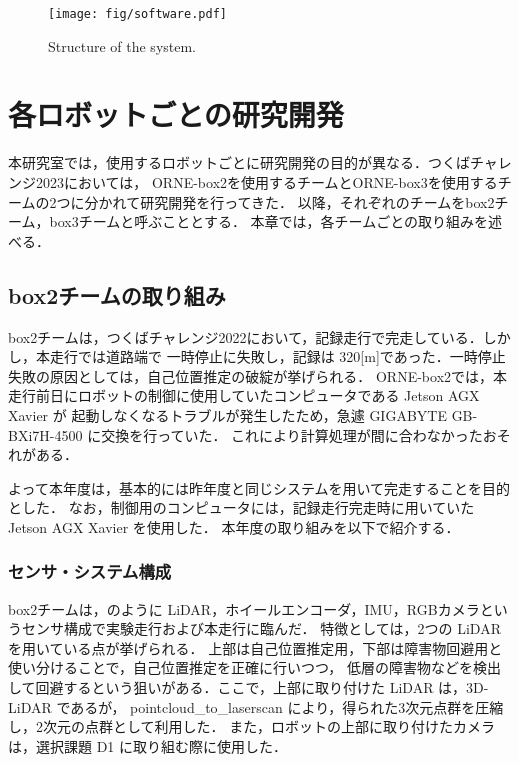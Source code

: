 \documentclass[twocolumn, 9pt]{jsproceedings}
\begin{document}
\begin{figure}[h!]
  \centering
  \texttt{[image: fig/software.pdf]}
  \caption{Structure of the system.}
  \label{fig:soft-fig}
\end{figure}

\vspace*{2mm}

\section{各ロボットごとの研究開発}
本研究室では，使用するロボットごとに研究開発の目的が異なる．つくばチャレンジ2023においては，
ORNE-box2を使用するチームとORNE-box3を使用するチームの2つに分かれて研究開発を行ってきた．
以降，それぞれのチームをbox2チーム，box3チームと呼ぶこととする．
本章では，各チームごとの取り組みを述べる．

\subsection{box2チームの取り組み}
box2チームは，つくばチャレンジ2022において，記録走行で完走している．しかし，本走行では道路端で
一時停止に失敗し，記録は 320[m]であった．一時停止失敗の原因としては，自己位置推定の破綻が挙げられる．
ORNE-box2では，本走行前日にロボットの制御に使用していたコンピュータである Jetson AGX Xavier が
起動しなくなるトラブルが発生したため，急遽 GIGABYTE GB-BXi7H-4500 に交換を行っていた．
これにより計算処理が間に合わなかったおそれがある．

よって本年度は，基本的には昨年度と同じシステムを用いて完走することを目的とした．
なお，制御用のコンピュータには，記録走行完走時に用いていた Jetson AGX Xavier を使用した．
本年度の取り組みを以下で紹介する．

\subsubsection{センサ・システム構成}
box2チームは，のように LiDAR，ホイールエンコーダ，IMU，RGBカメラというセンサ構成で実験走行および本走行に臨んだ．
特徴としては，2つの LiDAR を用いている点が挙げられる．
上部は自己位置推定用，下部は障害物回避用と使い分けることで，自己位置推定を正確に行いつつ，
低層の障害物などを検出して回避するという狙いがある．ここで，上部に取り付けた LiDAR は，3D-LiDAR であるが，
pointcloud\_to\_laserscan\cite{pointcloud} により，得られた3次元点群を圧縮し，2次元の点群として利用した．
また，ロボットの上部に取り付けたカメラは，選択課題 D1 に取り組む際に使用した．\\
\end{document}
